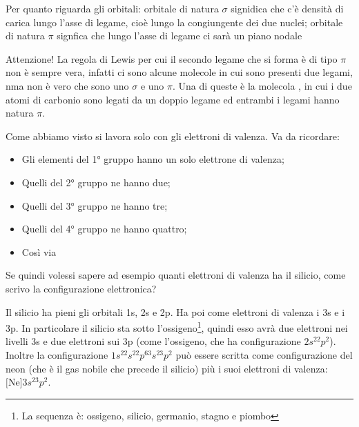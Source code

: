 Per quanto riguarda gli orbitali: orbitale di natura $\sigma$ signidica che c'è densità di carica lungo l'asse di legame, cioè lungo la congiungente dei due nuclei; orbitale di natura $\pi$ signfica che lungo l'asse di legame ci sarà un piano nodale

Attenzione! La regola di Lewis per cui il secondo legame che si forma è di tipo $\pi$ non è sempre vera, infatti ci sono alcune molecole in cui sono presenti due legami, nma non è vero che sono uno $\sigma$ e uno $\pi$. Una di queste è la molecola , in cui i due atomi di carbonio sono legati da un doppio legame ed entrambi i legami hanno natura $\pi$.

Come abbiamo visto si lavora solo con gli elettroni di valenza. Va da ricordare:
\begin{itemize}
    \item Gli elementi del 1° gruppo hanno un solo elettrone di valenza;
    \item Quelli del 2° gruppo ne hanno due;
    \item Quelli del 3° gruppo ne hanno tre;
    \item Quelli del 4° gruppo ne hanno quattro;
    \item Così via
\end{itemize}

Se quindi volessi sapere ad esempio quanti elettroni di valenza ha il silicio, come scrivo la configurazione elettronica?

Il silicio ha pieni gli orbitali 1s, 2s e 2p. Ha poi come elettroni di valenza i 3s e i 3p. In particolare il silicio sta sotto l'ossigeno\footnote{La sequenza è: ossigeno, silicio, germanio, stagno e piombo}, quindi esso avrà due elettroni nei livelli 3s e due elettroni sui 3p (come l'ossigeno, che ha configurazione $2s^22p^2$). Inoltre la configurazione $1s^22s^22p^63s^23p^2$ può essere scritta come configurazione del neon (che è il gas nobile che precede il silicio) più i suoi elettroni di valenza: $\text{[Ne]}3s^23p^2$.
